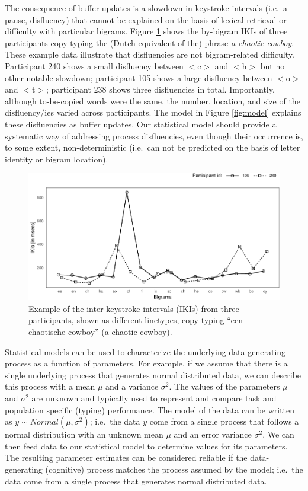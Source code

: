 \documentclass[
  english,
  man,mask,floatsintext]{apa7}
\begin{document}
The consequence of buffer updates is a slowdown in keystroke intervals (i.e.~a pause, disfluency) that cannot be explained on the basis of lexical retrieval or difficulty with particular bigrams. Figure \ref{fig:example2} shows the by-bigram IKIs of three participants copy-typing the (Dutch equivalent of the) phrase \emph{a chaotic cowboy}. These example data illustrate that disfluencies are not bigram-related difficulty. Participant 240 shows a small disfluency between \(<\)c\(>\) and \(<\)h\(>\) but no other notable slowdown; participant 105 shows a large disfluency between \(<\)o\(>\) and \(<\)t\(>\); participant 238 shows three disfluencies in total. Importantly, although to-be-copied words were the same, the number, location, and size of the disfluency/ies varied across participants. The model in Figure \ref{fig:model} explains these disfluencies as buffer updates. Our statistical model should provide a systematic way of addressing process disfluencies, even though their occurrence is, to some extent, non-deterministic (i.e.~can not be predicted on the basis of letter identity or bigram location).

\begin{figure}[bp!]

{\centering \includegraphics{report_files/figure-latex/example2-1} 

}

\caption{Example of the inter-keystroke intervals (IKIs) from three participants, shown as different linetypes, copy-typing ``een chaotische cowboy'' (a chaotic cowboy).}\label{fig:example2}
\end{figure}

Statistical models can be used to characterize the underlying data-generating process as a function of parameters. For example, if we assume that there is a single underlying process that generates normal distributed data, we can describe this process with a mean \(\mu\) and a variance \(\sigma^2\). The values of the parameters \(\mu\) and \(\sigma^2\) are unknown and typically used to represent and compare task and population specific (typing) performance. The model of the data can be written as \(y \sim Normal(\mu, \sigma^2)\); i.e.~the data \(y\) come from a single process that follows a normal distribution with an unknown mean \(\mu\) and an error variance \(\sigma^2\). We can then feed data to our statistical model to determine values for its parameters. The resulting parameter estimates can be considered reliable if the data-generating (cognitive) process matches the process assumed by the model; i.e.~the data come from a single process that generates normal distributed data.
\end{document}
